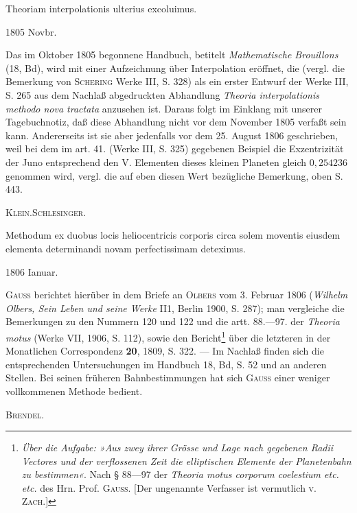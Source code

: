 \noindent\hspace*{\parindent}Theoriam interpolationis ulterius excoluimus.
\par\noindent\hfill 1805 Novbr.
\par\medskip\begingroup\small
\noindent\hspace*{\parindent}Das im Oktober 1805 begonnene Handbuch, betitelt \textit{Mathematische Brouillons} (18, Bd), wird mit einer Aufzeichnung über Interpolation eröffnet, die (vergl. die Bemerkung von \textsc{Schering} Werke III, S. 328) als ein erster Entwurf der Werke III, S. 265 aus dem Nachlaß abgedruckten Abhandlung \textit{Theoria interpolationis methodo nova tractata} anzusehen ist. Daraus folgt im Einklang mit unserer Tagebuchnotiz, daß diese Abhandlung nicht vor dem November 1805 verfaßt sein kann. Andererseits ist sie aber jedenfalls vor dem 25. August 1806 geschrieben, weil bei dem im art. 41. (Werke III, S. 325) gegebenen Beispiel die Exzentrizität der Juno entsprechend den V. Elementen dieses kleinen Planeten gleich \(0{,}254236\) genommen wird, vergl. die auf eben diesen Wert bezügliche Bemerkung, oben S. 443.
\par\noindent\hfill\textsc{Klein.\quad Schlesinger.}
\par\endgroup

\noindent\hspace*{\parindent}Methodum ex duobus locis heliocentricis corporis circa solem moventis eiusdem elementa determinandi novam perfectissimam deteximus.
\par\noindent\hfill 1806 Ianuar.
\par\medskip\begingroup\small
\renewcommand{\thefootnote}{*)}
\noindent\hspace*{\parindent}\textsc{Gauss} berichtet hierüber in dem Briefe an \textsc{Olbers} vom 3. Februar 1806 (\textit{Wilhelm Olbers, Sein Leben und seine Werke} II1, Berlin 1900, S. 287); man vergleiche die Bemerkungen zu den Nummern 120 und 122 und die artt. 88.—97. der \textit{Theoria motus} (Werke VII, 1906, S. 112), sowie den Bericht\footnote{\textit{Über die Aufgabe: »Aus zwey ihrer Grösse und Lage nach gegebenen Radii Vectores und der verflossenen Zeit die elliptischen Elemente der Planetenbahn zu bestimmen«}. Nach § 88—97 der \textit{Theoria motus corporum coelestium etc. etc.} des Hrn. Prof. \textsc{Gauss}. [Der ungenannte Verfasser ist vermutlich \textsc{v. Zach}.]} über die letzteren in der Monatlichen Correspondenz \textbf{20}, 1809, S. 322. — Im Nachlaß finden sich die entsprechenden Untersuchungen im Handbuch 18, Bd, S. 52 und an anderen Stellen. Bei seinen früheren Bahnbestimmungen hat sich \textsc{Gauss} einer weniger vollkommenen Methode bedient.
\par\noindent\hfill\textsc{Brendel.}
\par\endgroup

